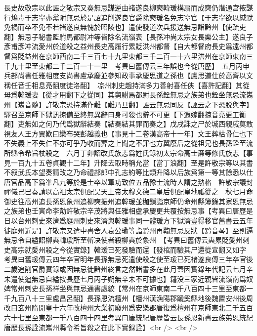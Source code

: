 長史故敬宗以此誣之敬宗又奏無忌謀逆由禇遂良柳奭韓瑗構扇而成奭仍潛通宫掖謀行鴆毒于志寜亦黨附無忌於是詔追削遂良官爵除奭瑗名免志寜官【于志寜欲以緘默免禍而卒不免不若禇遂良無愧於昭陵也】遣使發道次兵援送無忌詣黔州【使疏吏翻】無忌子秘書監駙馬都尉冲等皆除名流嶺表【長孫冲尚太宗女長樂公主】遂良子彥甫彥冲流愛州於道殺之益州長史高履行累貶洪州都督【自大都督府長史爲遠州都督爲貶益州在京師西南二千三百七十九里東都三千二百一十六里洪州在京師東南三千九十里至東都二千二百一十一里　考異曰舊傳云三年誤也今從唐歷】　五月丙申兵部尚書任雅相度支尚書盧承慶並參知政事承慶思道之孫也【盧思道仕於高齊以文稱任音壬相息亮翻度徒洛翻】　凉州刺史趙持滿多力善射喜任俠【喜許記翻】其從母爲韓瑗妻【從才用翻下之從同】其舅駙馬都尉長孫銓無忌之族弟也銓坐無忌流嶲州【嶲音髓】許敬宗恐持滿作難【難乃旦翻】誣云無忌同反【誣云之下恐脱與字】驛召至京師下獄訊掠備至終無異辭曰身可殺也辭不可更【下遐嫁翻掠音亮更工衡翻】吏無如之何乃代爲獄辭結奏【結奏結其罪而奏之】戊戌誅之尸於城西親戚莫敢視友人王方翼歎曰欒布哭彭越義也【事見十二卷漢高帝十一年】文王葬枯骨仁也下不失義上不失仁不亦可乎乃收而葬之上聞之不罪也方翼廢后之從祖兄也長孫銓至流所縣令希旨杖殺之　六月丁卯詔改氏族志爲姓氏錄初太宗命高士亷等修氏族志【事見一百九十五卷貞觀十二年】升降去取時稱允當【當丁浪翻】至是許敬宗等以其書不叙武氏本望奏請改之乃命禮部郎中孔志約等比類升降以后族爲第一等其餘悉以仕唐官品高下爲凖凡九等於是士卒以軍功致位五品豫士流時人謂之勲格　許敬宗議封禪儀己巳奏請以高祖太宗俱配昊天上帝太穆文德二皇后俱配皇地祗從之　秋七月命御史往高州追長孫恩象州追柳奭振州追韓瑗並枷鎻詣京師仍命州縣簿錄其家恩無忌之族弟也壬寅命李勣許敬宗辛茂將與任雅相盧承慶更共覆按無忌事【考異曰唐歷是日以台州刺史來濟爲庭州刺史來濟與韓瑗事同一體瑗方下獄濟豈得移官舊書云五年徙庭州近是】許敬宗又遣中書舍人袁公瑜等詣黔州再鞫無忌反狀【黔音琴】至則逼無忌令自縊詔柳奭韓瑗所至斬决使者殺柳奭於象州　【考異曰舊傳云奭累貶愛州刺史高宗就愛州殺之今從實錄】韓瑗已死發驗而還【發棺而驗其尸還從宣翻又如字　考異曰舊瑗傳云四年卒官明年長孫無忌死遣使殺之使至瑗已死禇遂良傳三年卒官後二歲追削官爵實錄或因無忌徙黔州終言之然諸書多在此月蓋因實錄年代記云七月辛未遣使逼無忌自縊按長歷七月丙子朔無辛未不可據也】籍没三家近親皆流嶺南爲奴婢常州刺史長孫祥坐與無忌通書處絞【常州在京師東南二千八百四十三里至東都一千九百八十三里處昌呂翻】長孫恩流檀州【檀州漢漁陽郡蹏奚縣地後魏置安州後周改曰玄州隋開皇十六年改檀州大業初廢州爲安樂郡唐復爲檀州在京師東北二千五百六十七里至東都一千八百四十四里考異曰唐統紀唐歷皆云長孫恩新書云族弟恩統紀唐歷長孫詮流嶲州縣令希旨殺之在此下實録詮】<br />
<br />
